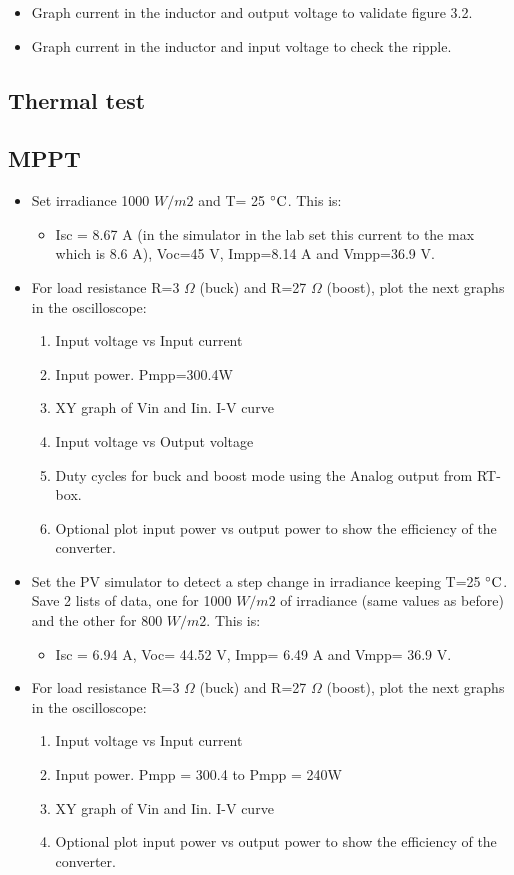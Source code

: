 \begin{itemize}
	\item Graph current in the inductor and output voltage to validate figure 3.2. 
	\item Graph current in the inductor and input voltage to check the ripple. 
\end{itemize}

\subsection{Thermal test}

\subsection{MPPT}

\begin{itemize}	
	\item Set irradiance 1000 $W /m2$ and T= 25 $\decC$. This is: 
		\begin{itemize}
		\item Isc = 8.67 A (in the simulator in the lab set this current to the max which is 8.6 A), Voc=45 V, Impp=8.14 A and Vmpp=36.9 V.
		\end{itemize} 
	\item For load resistance R=3 $\Omega$ (buck) and R=27 $\Omega$ (boost), plot the next graphs in the oscilloscope:
		\begin{enumerate}
		\item Input voltage vs Input current 
		\item Input power. Pmpp=300.4W
		\item XY graph of Vin and Iin. I-V curve
		\item Input voltage vs Output voltage
		\item Duty cycles for buck and boost mode using the Analog output from RT-box. 
		\item Optional plot input power vs output power to show the efficiency of the converter.
		\end{enumerate}
	
	\item Set the PV simulator to detect a step change in irradiance keeping T=25 $\decC$. Save 2 lists of data, one for 1000 $W /m2$ of irradiance (same values as before) and the other for 800 $W /m2$. This is:
		\begin{itemize}
		\item Isc = 6.94 A, Voc= 44.52 V, Impp= 6.49 A and Vmpp= 36.9 V.
      	\end{itemize} 
      \item For load resistance R=3 $\Omega$ (buck) and R=27 $\Omega$ (boost), plot the next graphs in the oscilloscope:
      \begin{enumerate}
      	\item Input voltage vs Input current 
      	\item Input power. Pmpp = 300.4 to Pmpp = 240W
      	\item XY graph of Vin and Iin. I-V curve
      	\item Optional plot input power vs output power to show the efficiency of the converter.
      \end{enumerate}
  

\end{itemize}
